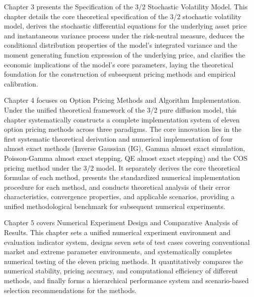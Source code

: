 Chapter 3 presents the Specification of the 3/2 Stochastic Volatility Model. This chapter details the core theoretical specification of the 3/2 stochastic volatility model, derives the stochastic differential equations for the underlying asset price and instantaneous variance process under the risk-neutral measure, deduces the conditional distribution properties of the model's integrated variance and the moment generating function expression of the underlying price, and clarifies the economic implications of the model's core parameters, laying the theoretical foundation for the construction of subsequent pricing methods and empirical calibration.

Chapter 4 focuses on Option Pricing Methods and Algorithm Implementation. Under the unified theoretical framework of the 3/2 pure diffusion model, this chapter systematically constructs a complete implementation system of eleven option pricing methods across three paradigms. The core innovation lies in the first systematic theoretical derivation and numerical implementation of four almost exact methods (Inverse Gaussian (IG), Gamma almost exact simulation, Poisson-Gamma almost exact stepping, QE almost exact stepping) and the COS pricing method under the 3/2 model. It separately derives the core theoretical formulas of each method, presents the standardized numerical implementation procedure for each method, and conducts theoretical analysis of their error characteristics, convergence properties, and applicable scenarios, providing a unified methodological benchmark for subsequent numerical experiments.

Chapter 5 covers Numerical Experiment Design and Comparative Analysis of Results. This chapter sets a unified numerical experiment environment and evaluation indicator system, designs seven sets of test cases covering conventional market and extreme parameter environments, and systematically completes numerical testing of the eleven pricing methods. It quantitatively compares the numerical stability, pricing accuracy, and computational efficiency of different methods, and finally forms a hierarchical performance system and scenario-based selection recommendations for the methods.

